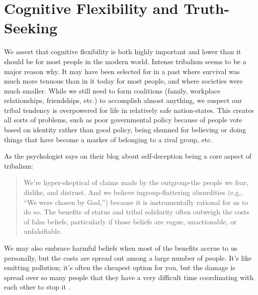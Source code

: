 \documentclass[12pt,letterpaper]{book}
\begin{document}
\section{Cognitive Flexibility and Truth-Seeking}
We assert that cognitive flexibility is both highly important and lower than it should be for most people in the modern world. Intense tribalism seems to be a major reason why. It may have been selected for in a past where survival was much more tenuous than in it today for most people, and where societies were much smaller. While we still need to form coalitions (family, workplace relationships, friendships, etc.) to accomplish almost anything, we suspect our tribal tendency is overpowered for life in relatively safe nation-states. This creates all sorts of problems, such as poor governmental policy because of people vote based on identity \cite{klein2020Polarized} rather than good policy, being shunned for believing or doing things that have become a marker of belonging to a rival group, etc.

As the psychologist \textcite{pinsof2024Truth} says on their blog about self-deception being a core aspect of tribalism:
\begin{quotation}
	We're hyper-skeptical of claims made by the outgroup-the people we fear, dislike, and distrust. And we believe ingroup-flattering absurdities (e.g., “We were chosen by God,”) because it is instrumentally rational for us to do so. The benefits of status and tribal solidarity often outweigh the costs of false beliefs, particularly if those beliefs are vague, unactionable, or unfalsifiable.
\end{quotation}
We may also embrace harmful beliefs when most of the benefits accrue to us personally, but the costs are spread out among a large number of people. It's like emitting pollution; it's often the cheapest option for you, but the damage is spread over so many people that they have a very difficult time coordinating with each other to stop it \cite{coaseTheorem}.
\end{document}
